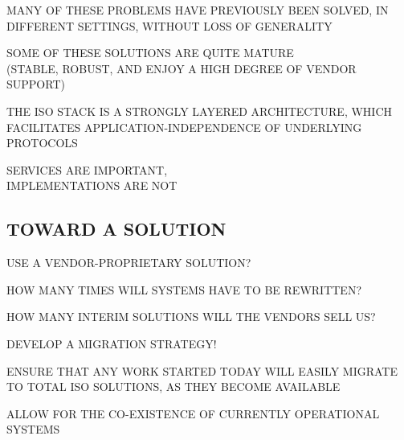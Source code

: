 \begin{bwslide}

\begin{nrtc}
\item	MANY OF THESE PROBLEMS HAVE PREVIOUSLY BEEN SOLVED, IN\\ DIFFERENT
	SETTINGS, WITHOUT LOSS OF GENERALITY
    \begin{nrtc}
    \item	SOME OF THESE SOLUTIONS ARE QUITE MATURE\\
		(STABLE, ROBUST, AND ENJOY A HIGH DEGREE OF VENDOR SUPPORT)
    \end{nrtc}

\item	THE ISO STACK IS A STRONGLY LAYERED ARCHITECTURE, WHICH\\ FACILITATES
	APPLICATION-INDEPENDENCE OF UNDERLYING\\ PROTOCOLS
    \begin{nrtc}
    \item	SERVICES ARE IMPORTANT,\\ IMPLEMENTATIONS ARE NOT
    \end{nrtc}
\end{nrtc}
\end{bwslide}


\begin{bwslide}
\part	{TOWARD A SOLUTION}\bf

\begin{nrtc}
\item	USE A VENDOR-PROPRIETARY SOLUTION?
    \begin{nrtc}
    \item	HOW MANY TIMES WILL SYSTEMS HAVE TO BE REWRITTEN?

    \item	HOW MANY INTERIM SOLUTIONS WILL THE VENDORS SELL US?
    \end{nrtc}

\item	DEVELOP A MIGRATION STRATEGY!
    \begin{nrtc}
    \item 	ENSURE THAT ANY WORK STARTED TODAY WILL EASILY MIGRATE TO
		TOTAL ISO SOLUTIONS, AS THEY BECOME AVAILABLE

    \item	ALLOW FOR THE CO-EXISTENCE OF CURRENTLY OPERATIONAL SYSTEMS
    \end{nrtc}
\end{nrtc}
\end{bwslide}


